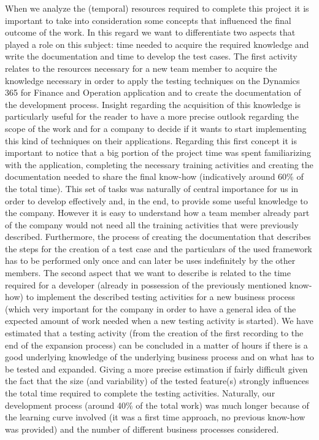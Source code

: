 When we analyze the (temporal) resources required to complete this project it is important to take into consideration some concepts that influenced the final outcome of the work. In this regard we want to differentiate two aspects that played a role on this subject: time needed to acquire the required knowledge and write the documentation and time to develop the test cases.
The first activity relates to the resources necessary for a new team member to acquire the knowledge necessary in order to apply the testing techniques on the Dynamics 365 for Finance and Operation application and to create the documentation of the development process. Insight regarding the acquisition of this knowledge is particularly useful for the reader to have a more precise outlook regarding the scope of the work and for a company to decide if it wants to start implementing this kind of techniques on their applications. Regarding this first concept it is important to notice that a big portion of the project time was spent familiarizing with the application, completing the necessary training activities and creating the documentation needed to share the final know-how (indicatively around 60\% of the total time). This set of tasks was naturally of central importance for us in order to develop effectively and, in the end, to provide some useful knowledge to the company. However it is easy to understand how a team member already part of the company would not need all the training activities that were previously described. Furthermore, the process of creating the documentation that describes the steps for the creation of a test case and the particulars of the used framework has to be performed only once and can later be uses indefinitely by the other members.
The second aspect that we want to describe is related to the time required for a developer (already in possession of the previously mentioned know-how) to implement the described testing activities for a new business process (which very important for the company in order to have a general idea of the expected amount of work needed when a new testing activity is started). We have estimated that a testing activity (from the creation of the first recording to the end of the expansion process) can be concluded in a matter of hours if there is a good underlying knowledge of the underlying business process and on what has to be tested and expanded. Giving a more precise estimation if fairly difficult given the fact that the size (and variability) of the tested feature(s) strongly influences the total time required to complete the testing activities. Naturally, our development process (around 40\% of the total work) was much longer because of the learning curve involved (it was a first time approach, no previous know-how was provided) and the number of different business processes considered. 


